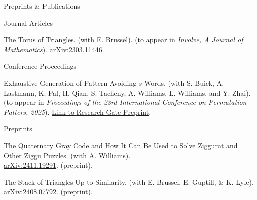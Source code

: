 \documentclass[
	11pt, %
]{cv} %
\begin{document}
\begin{rSection}{Preprints \& Publications}
	\begin{rSubsectionNumbered}{Journal Articles}
		\item The Torus of Triangles. (with E. Brussel). (to appear in \emph{Involve, A Journal of Mathematics}).	\href{http://arxiv.org/abs/2303.11446}{arXiv:2303.11446}.	
	\end{rSubsectionNumbered}
	\begin{rSubsectionNumbered}{Conference Proceedings}
		\item Exhaustive Generation of Pattern-Avoiding $s$-Words. (with S. Buick, A. Lastmann, K. Pal, H. Qian, S. Tacheny, A. Williams, L. Williams, and Y. Zhai). (to appear in \textit{Proceedings of the 23rd International Conference on Permutation Patters, 2025}). \href{https://www.researchgate.net/publication/391522113_Exhaustive_Generation_of_Pattern-Avoiding_s-Words}{Link to \underline{Research Gate Preprint}}.
	\end{rSubsectionNumbered}
	\begin{rSubsectionNumbered}{Preprints}
		\item The Quaternary Gray Code and How It Can Be Used to Solve Ziggurat and Other Ziggu Puzzles. (with A. Williams).\\ \href{http://arxiv.org/abs/2411.19291}{arXiv:2411.19291}. (preprint).
		\item The Stack of Triangles Up to Similarity. (with E. Brussel, E. Guptill, \& K. Lyle). \href{http://arxiv.org/abs/2408.07792}{arXiv:2408.07792}. (preprint).		
	\end{rSubsectionNumbered}
\end{rSection}
\end{document}
